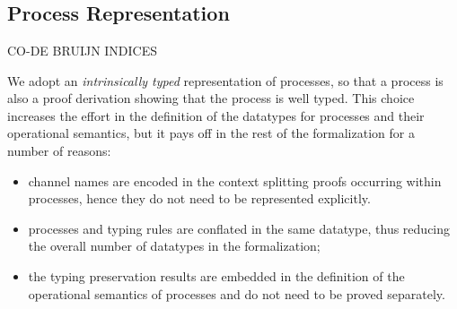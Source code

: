 \begin{code}
\AgdaSpace{}%
\AgdaSpace{}%
\AgdaSpace{}%
\AgdaSpace{}%
\AgdaSpace{}%
\AgdaSpace{}%
\AgdaSpace{}%
\AgdaSpace{}%
\<%
\\
\>[0]\AgdaSpace{}%
\AgdaSpace{}%
\AgdaSpace{}%
\AgdaSpace{}%
\AgdaSymbol{=}\AgdaSpace{}%
\<%
\\
\>[0]\AgdaSpace{}%
\AgdaSymbol{(}\AgdaSpace{}%
\AgdaSymbol{)}\AgdaSpace{}%
\AgdaSymbol{(}\AgdaSpace{}%
\AgdaSymbol{)}\AgdaSpace{}%
\AgdaSpace{}%
\AgdaSymbol{=}\AgdaSpace{}%
\AgdaSpace{}%
\AgdaSymbol{(}\AgdaSpace{}%
\AgdaSpace{}%
\AgdaSpace{}%
\AgdaSymbol{)}\<%
\\
\>[0]\AgdaSpace{}%
\AgdaSymbol{(}\AgdaSpace{}%
\AgdaSymbol{)}\AgdaSpace{}%
\AgdaSpace{}%
\AgdaSymbol{(}\AgdaSpace{}%
\AgdaSymbol{)}\AgdaSpace{}%
\AgdaSymbol{=}\AgdaSpace{}%
\AgdaSpace{}%
\AgdaSymbol{(}\AgdaSpace{}%
\AgdaSpace{}%
\AgdaSpace{}%
\AgdaSymbol{)}\<%
\end{code}

\subsection{Process Representation}
\label{sec:process-agda}

CO-DE BRUIJN INDICES

We adopt an \emph{intrinsically typed} representation of processes, so that a
process is also a proof derivation showing that the process is well typed. This
choice increases the effort in the definition of the datatypes for processes and
their operational semantics, but it pays off in the rest of the formalization
for a number of reasons:

\begin{itemize}
\item channel names are encoded in the context splitting proofs occurring within
  processes, hence they do not need to be represented explicitly.
\item processes and typing rules are conflated in the same datatype, thus
  reducing the overall number of datatypes in the formalization;
\item the typing preservation results are embedded in the definition of the
  operational semantics of processes and do not need to be proved separately.
\end{itemize}

